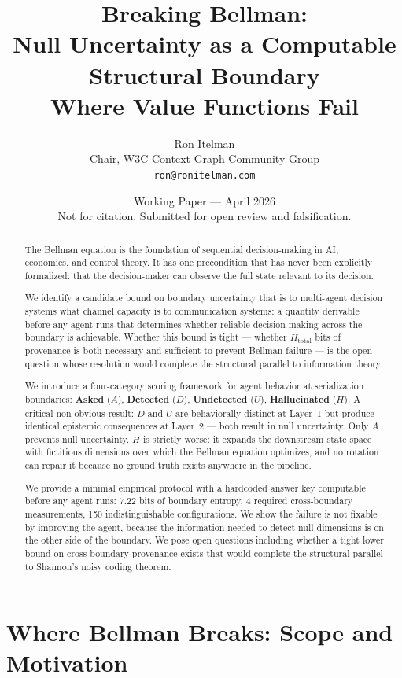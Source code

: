 \documentclass[11pt,a4paper]{article}
\title{Breaking Bellman:\\[6pt]
\large Null Uncertainty as a Computable Structural Boundary\\Where Value Functions Fail}
\author{Ron Itelman\\Chair, W3C Context Graph Community Group\\\texttt{ron@ronitelman.com}}
\date{Working Paper --- April 2026\\[4pt]
\small Not for citation. Submitted for open review and falsification.}
\begin{document}
\maketitle

\begin{abstract}
The Bellman equation is the foundation of sequential decision-making in AI, 
economics, and control theory. It has one precondition that has never been 
explicitly formalized: that the decision-maker can observe the full state 
relevant to its decision.

We identify a candidate bound on boundary uncertainty that is to 
multi-agent decision systems what channel capacity is to communication 
systems: a quantity derivable before any agent runs that determines 
whether reliable decision-making across the boundary is achievable. 
Whether this bound is tight --- whether $H_{\text{total}}$ bits of 
provenance is both necessary and sufficient to prevent Bellman failure 
--- is the open question whose resolution would complete the structural 
parallel to information theory.

We introduce a four-category scoring framework for agent behavior at 
serialization boundaries: \textbf{Asked} ($A$), \textbf{Detected} ($D$), 
\textbf{Undetected} ($U$), \textbf{Hallucinated} ($H$). A critical 
non-obvious result: $D$ and $U$ are behaviorally distinct at Layer~1 but 
produce identical epistemic consequences at Layer~2 --- both result in 
null uncertainty. Only $A$ prevents null uncertainty. $H$ is strictly 
worse: it expands the downstream state space with fictitious dimensions 
over which the Bellman equation optimizes, and no rotation can repair 
it because no ground truth exists anywhere in the pipeline.

We provide a minimal empirical protocol with a hardcoded answer key 
computable before any agent runs: 7.22 bits of boundary entropy, 4 
required cross-boundary measurements, 150 indistinguishable 
configurations. We show the failure is not fixable by improving the 
agent, because the information needed to detect null dimensions is on 
the other side of the boundary. We pose open questions including 
whether a tight lower bound on cross-boundary provenance exists that 
would complete the structural parallel to Shannon's noisy coding theorem.
\end{abstract}


\section{Where Bellman Breaks: Scope and Motivation}
\label{sec:motivation}
\end{document}
